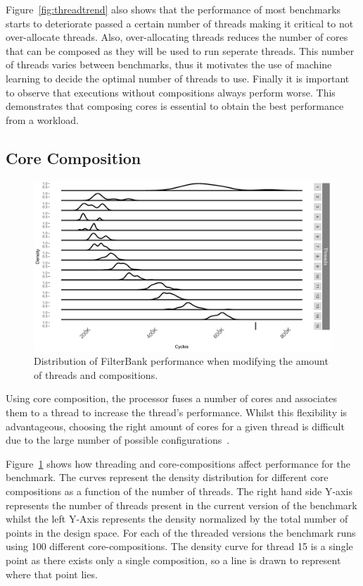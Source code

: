 Figure~\ref{fig:threadtrend} also shows that the performance of most benchmarks starts to deteriorate passed a certain number of threads making it critical to not over-allocate threads.
Also, over-allocating threads reduces the number of cores that can be composed as they will be used to run seperate threads.
This number of threads varies between benchmarks, thus it motivates the use of machine learning to decide the optimal number of threads to use.
Finally it is important to observe that executions without compositions always perform worse.
This demonstrates that composing cores is essential to obtain the best performance from a workload.


\subsection{Core Composition}

\begin{figure}[t]
  \includegraphics[width=1\textwidth]{streamit-paper/graphics/filterbank_tot.pdf}
  \caption{Distribution of FilterBank performance when modifying the amount of threads and compositions.}\label{fig:fbtotal}
\end{figure}

Using core composition, the processor fuses a number of cores and associates them to a thread to increase the thread's performance.
Whilst this flexibility is advantageous, choosing the right amount of cores for a given thread is difficult due to the large number of possible configurations~\cite{gulati2008multitaskingdmc}.

Figure~\ref{fig:fbtotal} shows how threading and core-compositions affect performance for the  benchmark.
The curves represent the density distribution for different core compositions as a function of the number of threads.
The right hand side Y-axis represents the number of threads present in the current version of the benchmark whilst the left Y-Axis represents the density normalized by the total number of points in the design space.
For each of the threaded versions the benchmark runs using 100 different core-compositions.
The density curve for thread 15 is a single point as there exists only a single composition, so a line is drawn to represent where that point lies.

